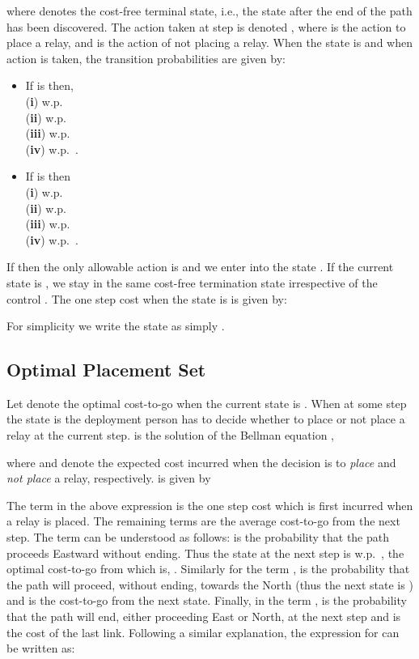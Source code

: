\documentclass[conference]{IEEEtran}
\begin{document}
where  denotes the cost-free terminal state, i.e., the state
after the end of the path has been discovered. The action taken at
step  is denoted , where  is the action to
place a relay, and  is the action of not placing a relay. When
the state is  and when action  is taken, the
transition probabilities are given by:
\begin {itemize}
\item If  is  then,\\
(\textbf{i})     w.p.\ \\
(\textbf{ii})     w.p.\ \\
(\textbf{iii})    w.p.\ \\
(\textbf{iv})    w.p.\ .

\item If  is  then\\
(\textbf{i})  w.p.\  \\
(\textbf{ii})  w.p.\  \\
(\textbf{iii})  w.p.\  \\
(\textbf{iv})  w.p.\  .
\end{itemize}

If  then the only allowable action is  and we
enter into the state . If the current state is , we stay
in the same cost-free termination state irrespective of the control
. The one step cost when the state is  is given
by:

For simplicity we write the state  as simply .

\subsection{Optimal Placement Set }
\label{nlos_relaxed_problem_section}
Let  denote the optimal cost-to-go when the current
state is . When at some step the state is  the
deployment person has to decide whether to place or not place a relay
at the current step.   is the solution of the Bellman
equation \cite[Page~137, Prop.~1.1]{Bertsekas2},

where  and  denote the expected cost incurred when the decision
is to \emph{place} and \emph{not place} a relay, respectively.  is given by

The term  in the above expression is the one step cost which is first 
incurred when a relay is placed. The remaining terms are the average cost-to-go from 
the next step. The term  can be understood as follows:
 is the probability that the path proceeds Eastward without ending. 
Thus the state at the next step is  w.p.\ , the optimal
cost-to-go from which is, . Similarly for the term , 
 is the probability that the path will proceed, without ending, towards the North
(thus the next state is ) and   is the 
cost-to-go from the next state. Finally, in the term ,  is the probability
that the path will end, either proceeding East or North, at the next step and 
is the cost of the last link.
Following a similar explanation, the expression for  can be written as:
\end{document}
